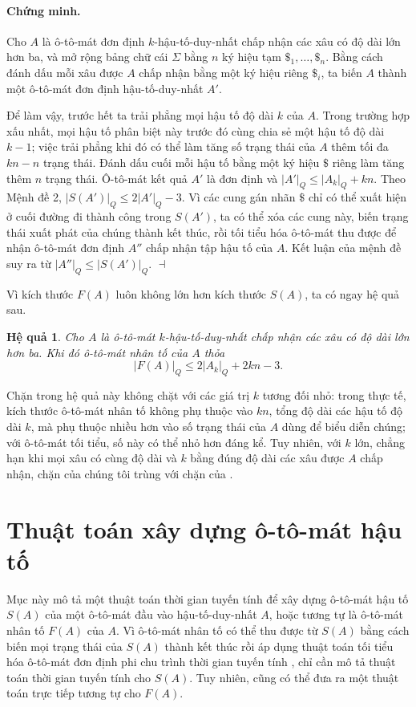 \documentclass[11pt]{article}
\newtheorem{corollary}{Hệ quả}
\newenvironment{proof}{\paragraph{Chứng minh.}}{\hfill$\dashv$\par}
\begin{document}
\begin{proof}
Cho $A$ là ô-tô-mát đơn định $k$-hậu-tố-duy-nhất chấp nhận các xâu có độ dài
lớn hơn ba, và mở rộng bảng chữ cái $\Sigma$ bằng $n$ ký hiệu tạm
$\mathtt{\$}_1,\ldots,\mathtt{\$}_n$. Bằng cách đánh dấu mỗi xâu được $A$ chấp
nhận bằng một ký hiệu riêng $\mathtt{\$}_i$, ta biến $A$ thành một ô-tô-mát đơn
định hậu-tố-duy-nhất $A'$.

Để làm vậy, trước hết ta trải phẳng mọi hậu tố độ dài $k$ của $A$. Trong
trường hợp xấu nhất, mọi hậu tố phân biệt này trước đó cùng chia sẻ một hậu tố
độ dài $k-1$; việc trải phẳng khi đó có thể làm tăng số trạng thái của $A$
thêm tối đa $kn-n$ trạng thái. Đánh dấu cuối mỗi hậu tố bằng một ký hiệu
$\mathtt{\$}$ riêng làm tăng thêm $n$ trạng thái. Ô-tô-mát kết quả $A'$ là đơn
định và $|A'|_Q\le |A_k|_Q+kn$. Theo Mệnh đề 2,
$|S(A')|_Q\le 2|A'|_Q-3$. Vì các cung gán nhãn $\mathtt{\$}$ chỉ có thể xuất
hiện ở cuối đường đi thành công trong $S(A')$, ta có thể xóa các cung này,
biến trạng thái xuất phát của chúng thành kết thúc, rồi tối tiểu hóa ô-tô-mát
thu được để nhận ô-tô-mát đơn định $A''$ chấp nhận tập hậu tố của $A$. Kết
luận của mệnh đề suy ra từ $|A''|_Q\le |S(A')|_Q$.
\end{proof}

Vì kích thước $F(A)$ luôn không lớn hơn kích thước $S(A)$, ta có ngay hệ quả
sau.

\begin{corollary}
Cho $A$ là ô-tô-mát $k$-hậu-tố-duy-nhất chấp nhận các xâu có độ dài lớn hơn
ba. Khi đó ô-tô-mát nhân tố của $A$ thỏa
\[
  |F(A)|_Q \le 2|A_k|_Q + 2kn - 3.
\tag{10}
\]
\end{corollary}

Chặn trong hệ quả này không chặt với các giá trị $k$ tương đối nhỏ: trong thực
tế, kích thước ô-tô-mát nhân tố không phụ thuộc vào $kn$, tổng độ dài các hậu
tố độ dài $k$, mà phụ thuộc nhiều hơn vào số trạng thái của $A$ dùng để biểu
diễn chúng; với ô-tô-mát tối tiểu, số này có thể nhỏ hơn đáng kể. Tuy nhiên,
với $k$ lớn, chẳng hạn khi mọi xâu có cùng độ dài và $k$ bằng đúng độ dài các
xâu được $A$ chấp nhận, chặn của chúng tôi trùng với chặn của
\cite{blumer-complete}.

\section{Thuật toán xây dựng ô-tô-mát hậu tố}

Mục này mô tả một thuật toán thời gian tuyến tính để xây dựng ô-tô-mát hậu tố
$S(A)$ của một ô-tô-mát đầu vào hậu-tố-duy-nhất $A$, hoặc tương tự là
ô-tô-mát nhân tố $F(A)$ của $A$. Vì ô-tô-mát nhân tố có thể thu được từ
$S(A)$ bằng cách biến mọi trạng thái của $S(A)$ thành kết thúc rồi áp dụng
thuật toán tối tiểu hóa ô-tô-mát đơn định phi chu trình thời gian tuyến tính
\cite{revuz}, chỉ cần mô tả thuật toán thời gian tuyến tính cho $S(A)$. Tuy
nhiên, cũng có thể đưa ra một thuật toán trực tiếp tương tự cho $F(A)$.
\end{document}
